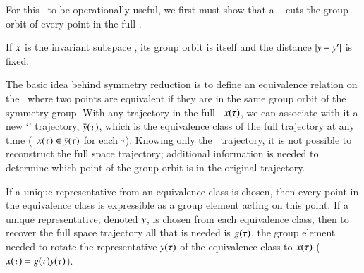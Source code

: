 For this \slice\ to be operationally useful, we first must show that a \slice\  cuts the group orbit of every point in the full \statesp.


If $x$ is the invariant subspace , its group orbit is itself and the distance $|y - {y'}|$ is fixed.




The basic idea behind symmetry reduction is to define an equivalence relation on the \statesp\ where two points are equivalent if they are in the same group orbit of the symmetry group. With any trajectory in the full \statesp\, $x(\tau)$, we can associate with it a new `\reducedsp' trajectory, $\bar{y}(\tau)$, which is the equivalence class of the full trajectory at any time (\ie\ $x(\tau) \in \bar{y}(\tau)$ for each $\tau$). Knowing only the \reducedsp\ trajectory, it is not possible to reconstruct the full space trajectory; additional information is needed to determine which point of the group orbit is in the original trajectory.

If a unique representative from an equivalence class is chosen, then every point in the equivalence class is expressible as a group element acting on this point. If a unique representative, denoted $y$, is chosen from each equivalence class, then to recover the full space trajectory all that is needed is $g(\tau)$, the group element needed to rotate the representative $y(\tau)$ of the equivalence class to $x(\tau)$ (\ie\ $x(\tau)=g(\tau) y(\tau)$).





